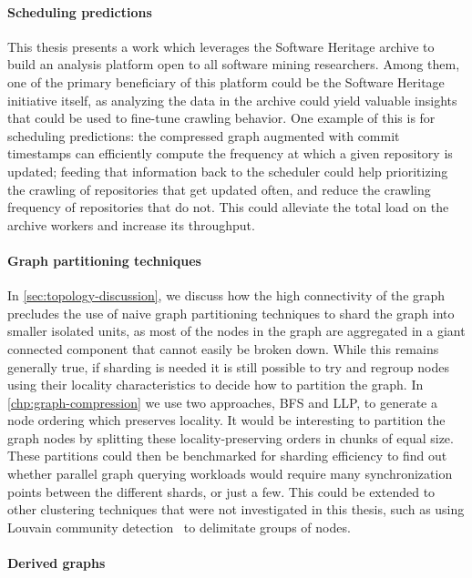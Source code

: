 \paragraph*{Scheduling predictions}

This thesis presents a work which leverages the Software Heritage archive to
build an analysis platform open to all software mining researchers. Among them,
one of the primary beneficiary of this platform could be the Software Heritage
initiative itself, as analyzing the data in the archive could yield valuable
insights that could be used to fine-tune crawling behavior. One example of this
is for scheduling predictions: the compressed graph augmented with commit
timestamps can efficiently compute the frequency at which a given repository is
updated; feeding that information back to the scheduler could help prioritizing
the crawling of repositories that get updated often, and reduce the crawling
frequency of repositories that do not. This could alleviate the total load on
the archive workers and increase its throughput.

\paragraph*{Graph partitioning techniques}

In \cref{sec:topology-discussion}, we discuss how the high connectivity of the
graph precludes the use of naive graph partitioning techniques to shard the
graph into smaller isolated units, as most of the nodes in the graph are
aggregated in a giant connected component that cannot easily be broken down.
While this remains generally true, if sharding is needed it is still possible
to try and regroup nodes using their locality characteristics to decide how to
partition the graph. In \cref{chp:graph-compression} we use two approaches,
\gls{BFS} and \gls{LLP}, to generate a node ordering which preserves locality.
It would be interesting to partition the graph nodes by splitting these
locality-preserving orders in chunks of equal size. These partitions could then
be benchmarked for sharding efficiency to find out whether parallel graph
querying workloads would require many synchronization points between the
different shards, or just a few. This could be extended to other clustering
techniques that were not investigated in this thesis, such as using Louvain
community detection~\cite{blondel2008fast} to delimitate groups of nodes.

\paragraph*{Derived graphs}

